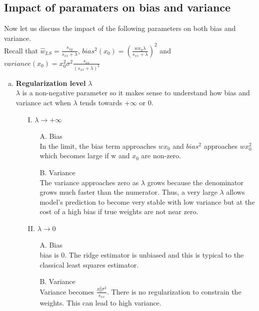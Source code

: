 \documentclass[12pt,titlepage]{article}
\begin{document}
\subsection{Impact of paramaters on bias and variance}
Now let us discuss the impact of the following parameters on both bias and variance. \\
Recall that $\hat{w}_{LS} = \frac{s_{xy}}{s_{xx} + \lambda}$, $bias^{2}(x_{0}) =\left(\frac{w x_{0} \lambda}{s_{xx} + \lambda}\right)^{2}$ and $variance(x_{0}) = x_{0}^{2} \sigma^{2} \frac{s_{xx}}{(s_{xx} + \lambda)^{2}}$
\begin{enumerate}[a.]
    \item 
    \textbf{Regularization level} $\lambda$ \\
    $\lambda$ is a non-negative parameter so it makes sense to understand how bias and variance act when $\lambda$ tends towards $+\infty$ or 0.
    \begin{itemize}
        \item[I.] $\lambda \rightarrow +\infty$ \\
        \begin{itemize}
            \item[A.] Bias \\
            In the limit, the bias term approaches $wx_{0}$ and $bias^{2}$ approaches $wx_{0}^{2}$ which becomes large if w and $x_{0}$ are non-zero.
            \item[B.] Variance \\
            The variance approaches zero as $\lambda$ grows because the denominator grows much faster than the numerator. Thus, a very large $\lambda$ allows model's prediction to become very stable with low variance but at the cost of a high bias if true weights are not near zero.
        \end{itemize}
        \item[II.] $\lambda \rightarrow 0$ \\
        \begin{itemize}
            \item[A.] Bias \\
            bias is 0. The ridge estimator is unbiased and this is typical to the classical least squares estimator. 
            \item[B.] Variance \\
            Variance becomes $ \frac{x_{0}^{2}\sigma^{2}}{s_{xx}}$. There is no regularization to constrain the weights. This can lead to high variance.
        \end{itemize}

\end{itemize}
\end{enumerate}
\end{document}
